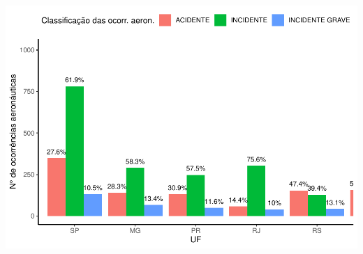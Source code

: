 \documentclass[
]{article}
\begin{document}
\begin{center}\includegraphics{4.Relatorio/pdf/index_files/figure-latex/unnamed-chunk-31-1} \end{center}
\end{document}
